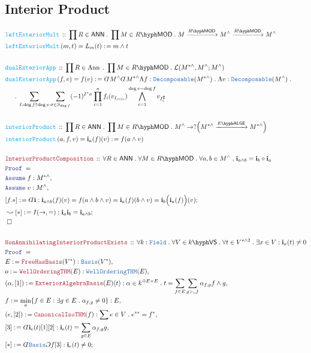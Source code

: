 \documentclass[12pt]{scrartcl}%
\newcommand{\TYPE}[1]{\textcolor{NavyBlue}{\mathtt{#1}}}%
\newcommand{\FUNC}[1]{\textcolor{Cerulean}{\mathtt{#1}}}%
\newcommand{\LOGIC}[1]{\textcolor{Blue}{\mathtt{#1}}}%
\newcommand{\THM}[1]{\textcolor{Maroon}{\mathtt{#1}}}%
\renewcommand{\.}{\; . \;} %
\newcommand{\de}{: \kern 0.1pc =} %
\newcommand{\Act}[1]{\left( #1 \right)} %
\newcommand{\Theorem}[2]{& \THM{#1} \, :: \, #2 \\ & \Proof = \\ } %
\newcommand{\DeclareFunc}[2]{& \FUNC{#1} \, :: \, #2 \\}%
\newcommand{\DefineNamedFunc}[4]{&  \FUNC{#1}\Act{#2} = #3 \de #4 \\}%
\newcommand{\NewLine}{\\ & \kern 1pc}%
\newcommand{\Page}[1]{ \begin{align*} #1 \end{align*}  }%
\newcommand{ \bd }{ \ByDef }%
\renewcommand{\c}{\complement}%
\newcommand{\Say}[3]{& #1 \de #2 : #3, \\} %
\newcommand{\Conclude}[3]{& #1 \de #2 : #3; \\}%
\newcommand{\DeriveConclude}[3]{& \leadsto #1 \de #2 : #3 ; \\} %
\newcommand{\Assume}[2]{& \LOGIC{Assume} \; #1 : #2, \\} %
\newcommand{\QED}{\; \square} %
\newcommand{\EndProof}{& \QED \\} %
\newcommand{\ByDef}{\rotatebox[origin=c]{-180}{$D$}}%
\newcommand{\ByConstr}{\rotatebox[origin=c]{-180}{$C$}}%
\newcommand{\Proof}{\LOGIC{Proof} \; } %
\newcommand{\Arrow}[1]{\xrightarrow{#1}}%
\DeclareMathOperator{\Ann}{Ann}   %
\newcommand{\VS}[1]{#1\hyph\mathsf{VS}} %
\newcommand{\LMOD}[1]{#1\hyph\mathsf{MOD}} %
\renewcommand{\L}{\mathcal{L}}
\newcommand{\Field}{\TYPE{Field}}
\newcommand{\ANN}{\mathsf{ANN}} %
\newcommand{\LALGE}[1]{#1\hyph\mathsf{ALGE}}%
\begin{document}
\subsection{Interior Product}
\Page{
	\DeclareFunc{leftExteriorMult}{ 
		\prod R \in \ANN \. 
		\prod M \in \LMOD{R} \. 
		M \Arrow{\LMOD{R}} M^{\wedge} \Arrow{\LMOD{R}} M^\wedge 
	}
	\DefineNamedFunc{leftExteriorMult}
	{
		m,t
	}
	{
		L_m(t)
	}
	{
		m \wedge t
	}
	\\
	\DeclareFunc{dualExteriorApp}{ \prod R  \in \Ann \. \prod M \in \LMOD{R} \. \L( M^{*\wedge},M^\wedge;M^\wedge) }
	\DefineNamedFunc{dualExteriorApp}{ f,v  }{ f(v) }
	{
		\bd M^{\wedge}\bd M^{*\wedge}
		\Lambda f : \TYPE{Decomposable}(M^{*\wedge}) \.
		\Lambda v : \TYPE{Decomposable}(M^\wedge) \.
		\NewLine \. 
		\sum_{I : \deg f \uparrow \deg v}\sum_{\sigma \in S_{\deg f}} (-1)^{I^*\sigma} \prod^{n}_{i=1} f_i(v_{I_{\sigma(i)}}) \bigwedge^{\deg v - \deg f}_{i=1} v_{I^\c_i}                             
	}
	\\
	\DeclareFunc{interiorProduct}
	{
		\prod R \in \ANN \.
		\prod M \in \LMOD{R} \.
		M^\wedge \to ?\Big(M^{*\wedge} \Arrow{\LALGE{E}} M^{*\wedge}\Big) 
	}
	\DefineNamedFunc{interiorProduct}{a,f,v}{ \mathbf{i}_a(f)(v) }{ f(a \wedge v)  }  
	\\
	\Theorem{InteriorProductComposition}{  
		\forall R \in \ANN \.
		\forall M \in \LMOD{R} \.
		\forall a,b \in M^\wedge \.
		\mathbf{i}_{a \wedge b} = \mathbf{i}_b \circ \mathbf{i}_a
	}
	\Assume{f}{M^{*\wedge}}
	\Assume{v}{M^\wedge}
	\Conclude{[f.*]}{ \bd \mathbf{i}}
	{
		\mathbf{i}_{a \wedge b}(f)(v) = 
		f( a \wedge b \wedge v ) =
		\mathbf{i}_a(f)(b \wedge v  ) =
		\mathbf{i}_b\Big( \mathbf{i}_a(f)\Big)(v)
	}
	\DeriveConclude{[*]}{I(\to,=)}{\mathbf{i}_a\mathbf{i}_b = \mathbf{i}_{a \wedge b}}
	\EndProof
	\\
	\Theorem{NonAnnihilatingInteriorProductExists}
	{
		\forall k : \Field \.
		\forall V \in \VS{k} \. 
		\forall t \in V^{\star\wedge2} \.
		\exists x \in V :  
		\mathbf{i}_x(t) \neq 0           
	}
	\Say{E}{\THM{FreeHasBasis}(V^*)}{\TYPE{Basis}(V^*)}
	\Say{o}{\THM{WellOrderingTHM}(E)}{\TYPE{WellOrderingTHM}(E)}
	\Say{(\alpha,[1])}{\THM{ExteriorAlgebraBasis}(E)(t)} 
	{
		\alpha \in k^{\oplus E \times E} \. 
		t = \sum_{f \in E} \sum_{g >_o f} \alpha_{f,g} f \wedge g
	}
	\Say{f}{\min_o \{ f \in E : \exists g \in E \. \alpha_{f,g} \neq 0 \}}{E}
	\Say{(e,[2])}{\THM{CanonicalIsoTHM}(f)}{ \sum e \in V \. e^{**} = f^*}
	\Say{[3]}{\bd \mathbf{i}_e(t)[1][2] }{\mathbf{i}_e(t) = \sum_{g \in E} \alpha_{f,g} g}
	\Conclude{[*]}{\bd \TYPE{Basis}\ByConstr f [3]}{\mathbf{i}_e(t) \neq 0}
}
\end{document}
